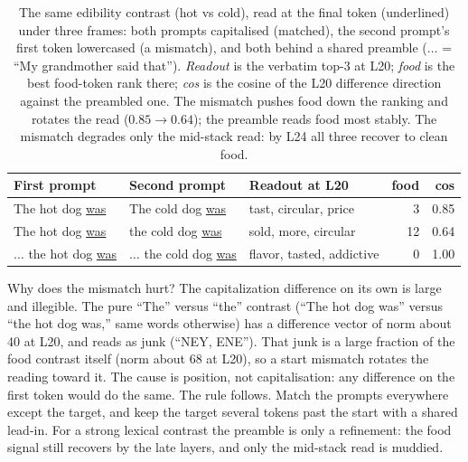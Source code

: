 \documentclass[11pt]{article}
\begin{document}
\begin{table}[htbp]
\centering
\small
\begin{tabular}{@{}ll l r r@{}}
\toprule
First prompt & Second prompt & Readout at L20 & food & cos \\
\midrule
The hot dog \underline{was}          & The cold dog \underline{was}          & tast, circular, price     & 3  & 0.85 \\
The hot dog \underline{was}          & the cold dog \underline{was}          & sold, more, circular      & 12 & 0.64 \\
$\ldots$ the hot dog \underline{was} & $\ldots$ the cold dog \underline{was} & flavor, tasted, addictive & 0  & 1.00 \\
\bottomrule
\end{tabular}
\caption{The same edibility contrast (hot vs cold), read at the final token
(underlined) under three frames: both prompts capitalised (matched), the second prompt's
first token lowercased (a mismatch), and both behind a shared preamble
($\ldots$ = ``My grandmother said that''). \emph{Readout} is the verbatim top-3
at L20; \emph{food} is the best food-token rank there; \emph{cos} is the cosine
of the L20 difference direction against the preambled one. The mismatch pushes
food down the ranking and rotates the read ($0.85\!\to\!0.64$); the preamble
reads food most stably. The mismatch degrades only the mid-stack read: by L24
all three recover to clean food.}
\label{tab:preamble}
\end{table}

Why does the mismatch hurt? The capitalization difference on its own is large
and illegible. The pure ``The'' versus ``the'' contrast (``The hot dog was''
versus ``the hot dog was,'' same words otherwise) has a difference vector of
norm about 40 at L20, and reads as junk (``NEY, ENE''). That junk is a large
fraction of the food contrast itself (norm about 68 at L20), so a start mismatch
rotates the reading toward it. The cause is position, not capitalisation: any
difference on the first token would do the same. The rule follows. Match the
prompts everywhere except the target, and keep the target several tokens past
the start with a shared lead-in. For a strong lexical contrast the preamble is only a
refinement: the food signal still recovers by the late layers, and only the
mid-stack read is muddied. 
\end{document}
